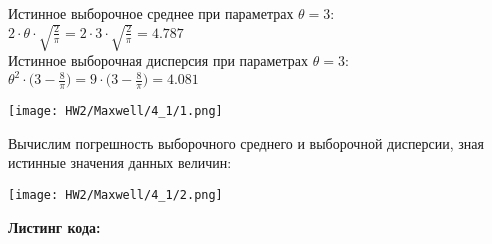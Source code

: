 \documentclass[14pt,a4paper,oneside]{extbook}
\begin{document}
    Истинное выборочное среднее при параметрах $\displaystyle \theta = 3$:\\
    $\displaystyle 2 \cdot \theta \cdot \sqrt{\frac{2}{\pi}} = 2 \cdot 3 \cdot \sqrt{\frac{2}{\pi}} = 4.787$\\
    Истинное выборочная дисперсия при параметрах $\displaystyle \theta = 3:$\\
    $\displaystyle \theta^{2} \cdot \Big(3 - \frac{8}{\pi} \Big) = 9 \cdot \Big(3 - \frac{8}{\pi} \Big) = 4.081$
    \\
    \begin{center}
        \texttt{[image: HW2/Maxwell/4\_1/1.png]}
    \end{center}
    Вычислим погрешность выборочного среднего и выборочной дисперсии, зная истинные значения данных величин:
    \begin{center}
        \texttt{[image: HW2/Maxwell/4\_1/2.png]}
    \end{center}
    \textbf{Листинг кода:}
    
\end{document}
